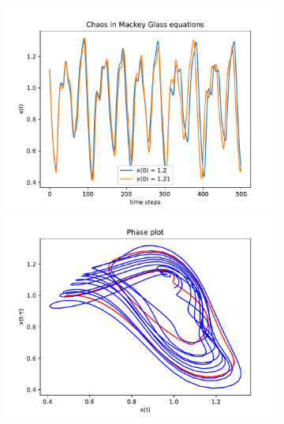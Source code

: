 \documentclass{article}
\begin{document}
\begin{figure}
    \centering
    \begin{subfigure}{.51\textwidth}
        \centering
        \includegraphics[width=\textwidth]{figures/mg_chaos_17.pdf}
        \includegraphics[width=\textwidth]{figures/17.pdf}
    \end{subfigure}
    \hspace{-6mm}
    \begin{subfigure}{.51\textwidth}
        \centering

\end{subfigure}
\end{figure}
\end{document}
